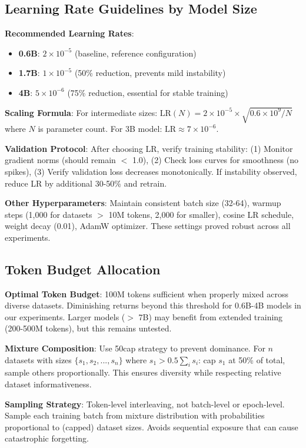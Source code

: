 \subsection{Learning Rate Guidelines by Model Size}

\textbf{Recommended Learning Rates}:
\begin{itemize}
\item \textbf{0.6B}: $2 \times 10^{-5}$ (baseline, reference configuration)
\item \textbf{1.7B}: $1 \times 10^{-5}$ (50\% reduction, prevents mild instability)
\item \textbf{4B}: $5 \times 10^{-6}$ (75\% reduction, essential for stable training)
\end{itemize}

\textbf{Scaling Formula}: For intermediate sizes: $\text{LR}(N) = 2 \times 10^{-5} \times \sqrt{0.6 \times 10^9 / N}$ where $N$ is parameter count. For 3B model: $\text{LR} \approx 7 \times 10^{-6}$.

\textbf{Validation Protocol}: After choosing LR, verify training stability: (1) Monitor gradient norms (should remain $<$ 1.0), (2) Check loss curves for smoothness (no spikes), (3) Verify validation loss decreases monotonically. If instability observed, reduce LR by additional 30-50\% and retrain.

\textbf{Other Hyperparameters}: Maintain consistent batch size (32-64), warmup steps (1,000 for datasets $>$ 10M tokens, 2,000 for smaller), cosine LR schedule, weight decay (0.01), AdamW optimizer. These settings proved robust across all experiments.

\subsection{Token Budget Allocation}

\textbf{Optimal Token Budget}: 100M tokens sufficient when properly mixed across diverse datasets. Diminishing returns beyond this threshold for 0.6B-4B models in our experiments. Larger models ($>$ 7B) may benefit from extended training (200-500M tokens), but this remains untested.

\textbf{Mixture Composition}: Use 50cap strategy to prevent dominance. For $n$ datasets with sizes $\{s_1, s_2, ..., s_n\}$ where $s_1 > 0.5 \sum_i s_i$: cap $s_1$ at 50\% of total, sample others proportionally. This ensures diversity while respecting relative dataset informativeness.

\textbf{Sampling Strategy}: Token-level interleaving, not batch-level or epoch-level. Sample each training batch from mixture distribution with probabilities proportional to (capped) dataset sizes. Avoids sequential exposure that can cause catastrophic forgetting.

